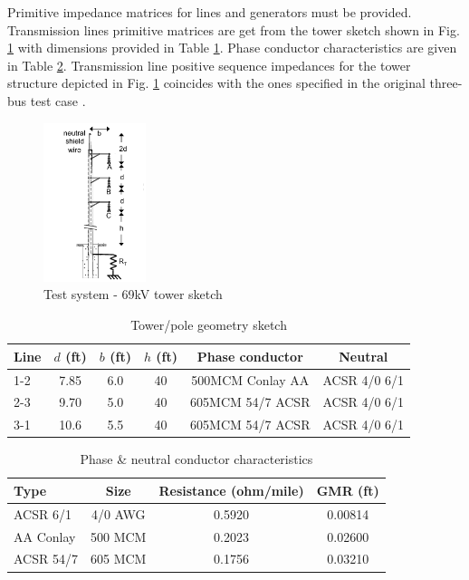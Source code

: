 \documentclass[letterpaper, 10 pt, conference]{IEEEtran}
\begin{document}
Primitive impedance matrices  for lines and generators must be provided. Transmission lines primitive matrices are get from the tower sketch shown in Fig. \ref{figure3} with dimensions provided in Table \ref{Table2}. Phase conductor characteristics are given in
Table  \ref{Table3}. Transmission line positive sequence impedances for the tower structure depicted in   Fig. \ref{figure3} coincides with the ones specified in the original three-bus test case \cite{urdaneta1988}.

     \begin{figure}[t!] \centerline{
     \includegraphics[width=3.0cm]{images/figure3.pdf}}
       \caption{Test system - 69kV tower sketch}
      \label{figure3}
        \end{figure}


\begin{table}[b]
\begin{center}\caption{Tower/pole geometry sketch}\label{Table2}
\centering
\begin{tabular}{lccccc}\hline
Line & $d$ (ft)  & $b$ (ft) & $h$ (ft) & Phase conductor & Neutral  \\\hline
1-2  & 7.85 & 6.0      &  40 & 500MCM Conlay AA & ACSR 4/0 6/1\\
2-3  & 9.70 & 5.0      &  40 & 605MCM 54/7 ACSR & ACSR 4/0 6/1\\
3-1  & 10.6 & 5.5      &  40 & 605MCM 54/7 ACSR & ACSR 4/0 6/1\\\hline
\end{tabular}
\end{center}
\end{table}

\begin{table}[b]
\begin{center}\caption{Phase \& neutral conductor characteristics}\label{Table3}
\centering
\begin{tabular}{lccc}\hline
Type & Size & Resistance (ohm/mile)  & GMR (ft)  \\\hline
ACSR 6/1 & 4/0 AWG  & 0.5920 & 0.00814 \\
AA Conlay & 500 MCM & 0.2023 & 0.02600 \\
ACSR 54/7 &605 MCM&0.1756 &0.03210\\\hline
\end{tabular}
\end{center}
\end{table}
\end{document}
